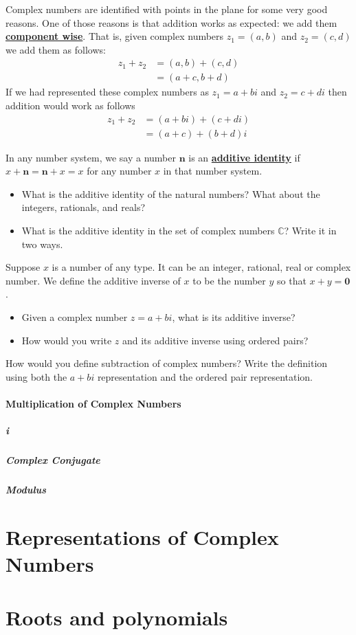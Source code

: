 \documentclass[11pt]{article}
\newenvironment{task}
	{\begin{mdframed}[linecolor=lightgray, linewidth=3pt]\raggedright}
	{\end{mdframed}}
\renewcommand\emph[1]{\underline{\bf{#1}}} %
\theoremstyle{definition}
\begin{document}
Complex numbers are identified with points in the plane for some very good reasons. One of those reasons is that addition works as expected: we
add them \emph{component wise}. That is, given complex numbers $z_1=(a,b)$ and $z_2 = (c,d)$ we add them as follows:
\begin{align*}
  z_1 + z_2 &= (a,b)+(c,d)\\
            &= (a+c, b+d)
\end{align*}
If we had represented these complex numbers as $z_1=a+bi$ and $z_2=c+di$ then addition would work as follows
\begin{align*}
  z_1 + z_2 &= (a+bi)+(c+di)\\
            &= (a+c) + (b+d)i
\end{align*}

\begin{task}
  In any number system, we say a number $\mathbf{n}$ is an \emph{additive identity} if $x + \mathbf{n} = \mathbf{n} + x = x$ for any number $x$ in that 
  number system.
  \begin{itemize}
    \item What is the additive identity of the natural numbers? What about the integers, rationals, and reals?
    \item What is the additive identity in the set of complex numbers $\mathbb{C}$? Write it in two ways.
  \end{itemize}
  Suppose $x$ is a number of any type. It can be an integer, rational, real or complex number. We define the additive inverse of $x$ to be the number $y$ so
  that $x+y = \textbf{0}$. 
\begin{itemize}
  \item Given a complex number $z = a+bi$, what is its additive inverse? 
  \item How would you write $z$ and its additive inverse using ordered pairs?
\end{itemize}
  How would you define subtraction of complex numbers? Write the definition using both the $a+bi$ representation and the ordered pair representation.
\end{task}

\subsection{Multiplication of Complex Numbers}

\subsubsection{i}

\subsubsection{Complex Conjugate}

\subsubsection{Modulus}



\part{Representations of Complex Numbers}

\part{Roots and polynomials}
\end{document}
